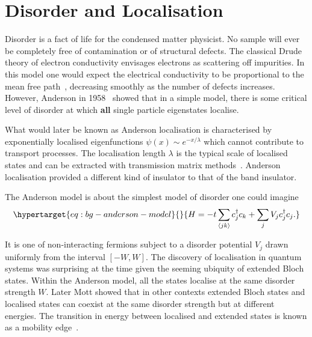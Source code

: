 \hypertarget{bg-disorder-and-localisation}{%
\section{Disorder and Localisation}\label{bg-disorder-and-localisation}}

Disorder is a fact of life for the condensed matter physicist. No sample will ever be completely free of contamination or of structural defects. The classical Drude theory of electron conductivity envisages electrons as scattering off impurities. In this model one would expect the electrical conductivity to be proportional to the mean free path~\autocite{lagendijkFiftyYearsAnderson2009}, decreasing smoothly as the number of defects increases. However, Anderson in 1958~\autocite{andersonAbsenceDiffusionCertain1958} showed that in a simple model, there is some critical level of disorder at which \textbf{all} single particle eigenstates localise.

What would later be known as Anderson localisation is characterised by exponentially localised eigenfunctions \(\psi(x) \sim e^{-x/\lambda}\) which cannot contribute to transport processes. The localisation length \(\lambda\) is the typical scale of localised states and can be extracted with transmission matrix methods~\autocite{pendrySymmetryTransportWaves1994}. Anderson localisation provided a different kind of insulator to that of the band insulator.

The Anderson model is about the simplest model of disorder one could imagine \begin{equation}\protect\hypertarget{eq:bg-anderson-model}{}{
H = -t\sum_{\langle jk \rangle} c^\dagger_j c_k + \sum_j V_j c_j^\dagger c_j.
}\label{eq:bg-anderson-model}\end{equation}

It is one of non-interacting fermions subject to a disorder potential \(V_j\) drawn uniformly from the interval \([-W,W]\). The discovery of localisation in quantum systems was surprising at the time given the seeming ubiquity of extended Bloch states. Within the Anderson model, all the states localise at the same disorder strength \(W\). Later Mott showed that in other contexts extended Bloch states and localised states can coexist at the same disorder strength but at different energies. The transition in energy between localised and extended states is known as a mobility edge~\autocite{mottMetalInsulatorTransitions1978}.

